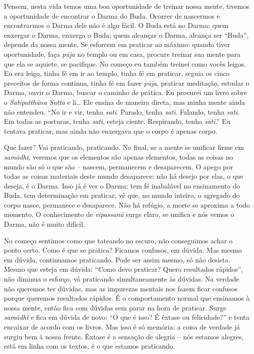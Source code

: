 Pensem, nesta vida temos uma boa oportunidade de treinar nossa
mente, tivemos a oportunidade de encontrar o Darma do Buda. Ocorrer de
nascermos e encontrarmos o Darma dele não é algo fácil. O Buda está no
Darma: quem enxergar o Darma, enxerga o Buda; quem alcançar o Darma,
alcança ser “Buda”, depende da nossa mente. Se esforcem em praticar ao
máximo: quando tiver oportunidade, faça \textit{p\=uja} no templo ou em
casa, procure treinar sua mente para que ela se aquiete, se pacifique.
No começo eu também treinei como vocês leigos. Eu era leigo, tinha fé
em ir ao templo, tinha fé em praticar, seguia os cinco preceitos de
forma contínua, tinha fé em fazer \textit{p\=uja}, praticar meditação,
estudar o Darma, ouvir o Darma, buscar o caminho de prática. Eu
procurei um livro sobre o \textit{Satipatth\=ana Sutta} e li… Ele
ensina de maneira direta, mas minha mente ainda não entendeu. “No ir e
vir, tenha \textit{sati}. Parado, tenha \textit{sati}. Falando, tenha
\textit{sati}. Em todas as posturas, tenha \textit{sati}, esteja
ciente. Respirando, tenha \textit{sati}.” Eu tentava praticar, mas
ainda não enxergava que o corpo é apenas corpo. 

Que fazer? Vai praticando, praticando. No final, se a mente se
unificar firme em \textit{sam\=adhi}, veremos que os elementos são
apenas elementos, todas as coisas no mundo são só o que são – nascem,
permanecem e desaparecem. O apego por todas as coisas materiais deste
mundo desaparece: não há desejo por elas, o que deseja, é o Darma. Isso
já é ver o Darma: tem fé inabalável no ensinamento do Buda, tem
determinação em praticar, vê que, no mundo inteiro, o agregado do corpo
nasce, permanece e desaparece. Não há refúgio, a morte se aproxima a
todo momento. O conhecimento de \textit{vipassan\=a} surge claro, se
unifica e nós vemos o Darma, não é muito difícil. 

No começo sentimos como que tateando no escuro, não conseguimos
achar o ponto certo. Como é que se pratica? Ficamos confusos, em
dúvida. Mas mesmo em dúvida, continuamos praticando. Pode ser assim
mesmo, só não desista. Mesmo que esteja em dúvida: “Como devo praticar?
Quero resultados rápidos”, não diminua o esforço, vá praticando
simultaneamente às dúvidas. Na verdade não queremos ter dúvidas, mas as
impurezas mentais nos fazem ficar confusos porque queremos resultados
rápidos. É o comportamento normal que ensinamos à nossa mente, então
fica com dúvidas sem parar na hora de praticar. Surge
\textit{sam\=adhi} e fica em dúvida de novo: “O que é isso? É êxtase ou
felicidade?” e tenta encaixar de acordo com os livros. Mas isso é só
memória: a coisa de verdade já surgiu bem à nossa frente. Êxtase é a
sensação de alegria – nós estamos alegres, está em linha com os textos,
é o que estamos praticando. 

